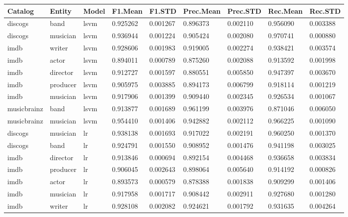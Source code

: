 \documentclass[epsfig,a4paper,11pt,titlepage,twoside,openany]{book}
\begin{document}
\begin{longtable}{|l|l|l|l|l|l|l|l|l|}
\hline
Catalog     & Entity   & Model                & F1.Mean  & F1.STD   & Prec.Mean & Prec.STD & Rec.Mean & Rec.STD \\ \hline
discogs     & band     & lsvm                 & 0.925262 & 0.001267 & 0.896373  & 0.002110 & 0.956090    & 0.003388   \\
discogs     & musician & lsvm                 & 0.936944 & 0.001224 & 0.905424  & 0.002080 & 0.970741    & 0.000880   \\
imdb        & writer   & lsvm                 & 0.928606 & 0.001983 & 0.919005  & 0.002274 & 0.938421    & 0.003574   \\
imdb        & actor    & lsvm                 & 0.894011 & 0.000789 & 0.875260  & 0.002088 & 0.913592    & 0.001998   \\
imdb        & director & lsvm                 & 0.912727 & 0.001597 & 0.880551  & 0.005850 & 0.947397    & 0.003670   \\
imdb        & producer & lsvm                 & 0.905975 & 0.003885 & 0.894173  & 0.006799 & 0.918114    & 0.001219   \\
imdb        & musician & lsvm                 & 0.917906 & 0.001399 & 0.909440  & 0.002345 & 0.926534    & 0.001067   \\
musicbrainz & band     & lsvm                 & 0.913877 & 0.001689 & 0.961199  & 0.003976 & 0.871046    & 0.006050   \\
musicbrainz & musician & lsvm                 & 0.954410 & 0.001406 & 0.942882  & 0.002112 & 0.966225    & 0.001090   \\ \hline
discogs     & musician & lr & 0.938138 & 0.001693 & 0.917022  & 0.002191 & 0.960250    & 0.001370   \\
discogs     & band     & lr & 0.924791 & 0.001550 & 0.908952  & 0.001476 & 0.941198    & 0.003025   \\
imdb        & director & lr & 0.913846 & 0.000694 & 0.892154  & 0.004468 & 0.936658    & 0.003834   \\
imdb        & producer & lr & 0.906045 & 0.002643 & 0.898064  & 0.005640 & 0.914192    & 0.000826   \\
imdb        & actor    & lr & 0.893573 & 0.000579 & 0.878388  & 0.001838 & 0.909299    & 0.001406   \\
imdb        & musician & lr & 0.917958 & 0.001717 & 0.908442  & 0.002911 & 0.927680    & 0.001280   \\
imdb        & writer   & lr & 0.928108 & 0.002082 & 0.924621  & 0.001792 & 0.931635    & 0.004264   \\

\end{longtable}
\end{document}
